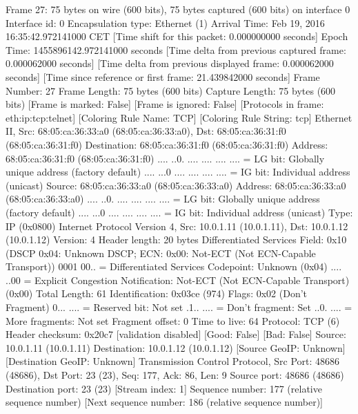 Frame 27: 75 bytes on wire (600 bits), 75 bytes captured (600 bits) on interface 0
    Interface id: 0
    Encapsulation type: Ethernet (1)
    Arrival Time: Feb 19, 2016 16:35:42.972141000 CET
    [Time shift for this packet: 0.000000000 seconds]
    Epoch Time: 1455896142.972141000 seconds
    [Time delta from previous captured frame: 0.000062000 seconds]
    [Time delta from previous displayed frame: 0.000062000 seconds]
    [Time since reference or first frame: 21.439842000 seconds]
    Frame Number: 27
    Frame Length: 75 bytes (600 bits)
    Capture Length: 75 bytes (600 bits)
    [Frame is marked: False]
    [Frame is ignored: False]
    [Protocols in frame: eth:ip:tcp:telnet]
    [Coloring Rule Name: TCP]
    [Coloring Rule String: tcp]
Ethernet II, Src: 68:05:ca:36:33:a0 (68:05:ca:36:33:a0), Dst: 68:05:ca:36:31:f0 (68:05:ca:36:31:f0)
    Destination: 68:05:ca:36:31:f0 (68:05:ca:36:31:f0)
        Address: 68:05:ca:36:31:f0 (68:05:ca:36:31:f0)
        .... ..0. .... .... .... .... = LG bit: Globally unique address (factory default)
        .... ...0 .... .... .... .... = IG bit: Individual address (unicast)
    Source: 68:05:ca:36:33:a0 (68:05:ca:36:33:a0)
        Address: 68:05:ca:36:33:a0 (68:05:ca:36:33:a0)
        .... ..0. .... .... .... .... = LG bit: Globally unique address (factory default)
        .... ...0 .... .... .... .... = IG bit: Individual address (unicast)
    Type: IP (0x0800)
Internet Protocol Version 4, Src: 10.0.1.11 (10.0.1.11), Dst: 10.0.1.12 (10.0.1.12)
    Version: 4
    Header length: 20 bytes
    Differentiated Services Field: 0x10 (DSCP 0x04: Unknown DSCP; ECN: 0x00: Not-ECT (Not ECN-Capable Transport))
        0001 00.. = Differentiated Services Codepoint: Unknown (0x04)
        .... ..00 = Explicit Congestion Notification: Not-ECT (Not ECN-Capable Transport) (0x00)
    Total Length: 61
    Identification: 0x03ce (974)
    Flags: 0x02 (Don't Fragment)
        0... .... = Reserved bit: Not set
        .1.. .... = Don't fragment: Set
        ..0. .... = More fragments: Not set
    Fragment offset: 0
    Time to live: 64
    Protocol: TCP (6)
    Header checksum: 0x20c7 [validation disabled]
        [Good: False]
        [Bad: False]
    Source: 10.0.1.11 (10.0.1.11)
    Destination: 10.0.1.12 (10.0.1.12)
    [Source GeoIP: Unknown]
    [Destination GeoIP: Unknown]
Transmission Control Protocol, Src Port: 48686 (48686), Dst Port: 23 (23), Seq: 177, Ack: 86, Len: 9
    Source port: 48686 (48686)
    Destination port: 23 (23)
    [Stream index: 1]
    Sequence number: 177    (relative sequence number)
    [Next sequence number: 186    (relative sequence number)]
